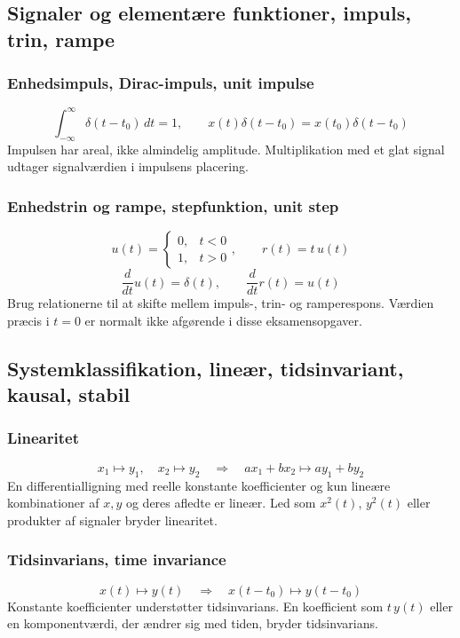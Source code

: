\subsection{Signaler og elementære funktioner, impuls, trin, rampe}

\subsubsection{Enhedsimpuls, Dirac-impuls, unit impulse}
\[
\int_{-\infty}^{\infty}\delta(t-t_0)\,dt=1,\qquad
x(t)\delta(t-t_0)=x(t_0)\delta(t-t_0)
\]
Impulsen har areal, ikke almindelig amplitude. Multiplikation med et glat signal udtager signalværdien i impulsens placering.

\subsubsection{Enhedstrin og rampe, stepfunktion, unit step}
\[
u(t)=\begin{cases}0,&t<0\\1,&t>0\end{cases},\qquad r(t)=t\,u(t)
\]
\[
\frac{d}{dt}u(t)=\delta(t),\qquad \frac{d}{dt}r(t)=u(t)
\]
Brug relationerne til at skifte mellem impuls-, trin- og ramperespons. Værdien præcis i \(t=0\) er normalt ikke afgørende i disse eksamensopgaver.

\subsection{Systemklassifikation, lineær, tidsinvariant, kausal, stabil}

\subsubsection{Linearitet}
\[
x_1\mapsto y_1,\quad x_2\mapsto y_2
\quad\Rightarrow\quad
a x_1+b x_2\mapsto a y_1+b y_2
\]
En differentialligning med reelle konstante koefficienter og kun lineære kombinationer af \(x,y\) og deres afledte er lineær. Led som \(x^2(t)\), \(y^2(t)\) eller produkter af signaler bryder linearitet.

\subsubsection{Tidsinvarians, time invariance}
\[
x(t)\mapsto y(t)\quad\Rightarrow\quad x(t-t_0)\mapsto y(t-t_0)
\]
Konstante koefficienter understøtter tidsinvarians. En koefficient som \(t\,y(t)\) eller en komponentværdi, der ændrer sig med tiden, bryder tidsinvarians.

